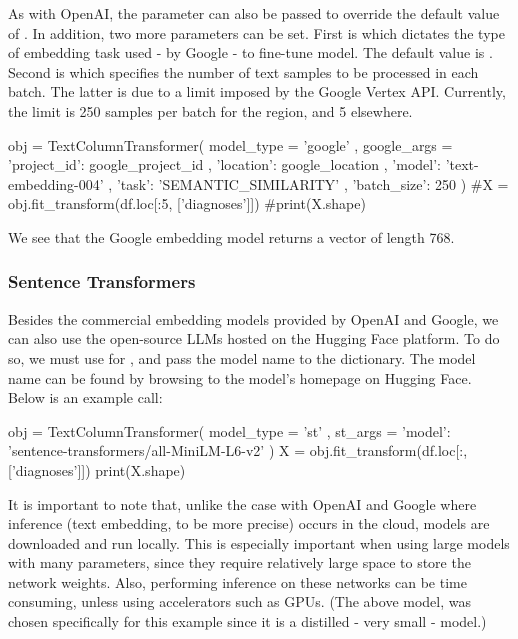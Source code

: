 \documentclass[article]{jss}
\begin{document}
As with OpenAI, the  parameter can also be passed to override the default value of . In addition, two more parameters can be set. First is  which dictates the type of embedding task used - by Google - to fine-tune model. The default value is . Second is  which specifies the number of text samples to be processed in each batch. The latter is due to a limit imposed by the Google Vertex API. Currently, the limit is 250 samples per batch for the  region, and 5 elsewhere.

\begin{pyblock}
obj = TextColumnTransformer(
    model_type = 'google'
    , google_args = {
        'project_id': google_project_id
        , 'location': google_location
        , 'model': 'text-embedding-004'
        , 'task': 'SEMANTIC_SIMILARITY'
        , 'batch_size': 250
    }
)
#X = obj.fit_transform(df.loc[:5, ['diagnoses']])
#print(X.shape)
\end{pyblock}

We see that the Google embedding model returns a vector of length 768.

\subsubsection{Sentence Transformers}\label{subsubsec:using-embed-st}

Besides the commercial embedding models provided by OpenAI and Google, we can also use the open-source LLMs hosted on the Hugging Face platform. To do so, we must use  for , and pass the model name to the  dictionary. The model name can be found by browsing to the model's homepage on Hugging Face. Below is an example call:
\begin{pyblock}
obj = TextColumnTransformer(
    model_type = 'st'
    , st_args = {
        'model': 'sentence-transformers/all-MiniLM-L6-v2'
    }
)
X = obj.fit_transform(df.loc[:, ['diagnoses']])
print(X.shape)
\end{pyblock}
\stdoutpythontex %

It is important to note that, unlike the case with OpenAI and Google where inference (text embedding, to be more precise) occurs in the cloud,  models are downloaded and run locally. This is especially important when using large models with many parameters, since they require relatively large space to store the network weights. Also, performing inference on these networks can be time consuming, unless using accelerators such as GPUs. (The above model,  was chosen specifically for this example since it is a distilled - very small - model.)
\end{document}

